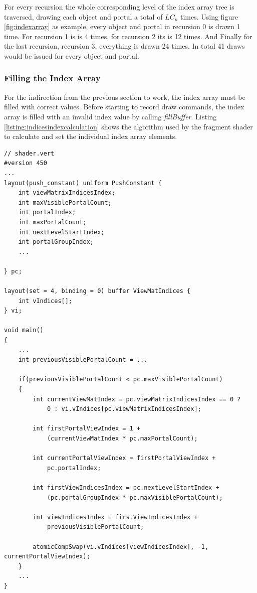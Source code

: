 For every recursion the whole corresponding level of the index array tree is traversed, drawing each object and portal a total of $LC_n$ times. Using figure \ref{fig:indexarray} as example, every object and portal in recursion 0 is drawn 1 time. For recursion 1 is is 4 times, for recursion 2 its is 12 times. And Finally for the last recursion, recursion 3, everything is drawn 24 times. In total 41 draws would be issued for every object and portal.

\subsubsection{Filling the Index Array}
For the indirection from the previous section to work, the index array must be filled with correct values. Before starting to record draw commands, the index array is filled with an invalid index value by calling \textit{fillBuffer}. Listing \ref{listing:indicesindexcalculation} shows the algorithm used by the fragment shader to calculate and set the individual index array elements.

\begin{lstlisting}[caption={Calculating Indices Index}, label=listing:indicesindexcalculation]
// shader.vert
#version 450
...
layout(push_constant) uniform PushConstant {	
	int viewMatrixIndicesIndex;
	int maxVisiblePortalCount;
	int portalIndex;
	int maxPortalCount;
	int nextLevelStartIndex;
	int portalGroupIndex;
	...

} pc;

layout(set = 4, binding = 0) buffer ViewMatIndices {
	int vIndices[];
} vi;

void main()
{
	...
	int previousVisiblePortalCount = ...
	
	if(previousVisiblePortalCount < pc.maxVisiblePortalCount)
	{
		int currentViewMatIndex = pc.viewMatrixIndicesIndex == 0 ? 
			0 : vi.vIndices[pc.viewMatrixIndicesIndex];
		
		int firstPortalViewIndex = 1 +
			(currentViewMatIndex * pc.maxPortalCount);
		
		int currentPortalViewIndex = firstPortalViewIndex +
			pc.portalIndex;
		
		int firstViewIndicesIndex = pc.nextLevelStartIndex +
			(pc.portalGroupIndex * pc.maxVisiblePortalCount);
			
		int viewIndicesIndex = firstViewIndicesIndex +
			previousVisiblePortalCount;
			
		atomicCompSwap(vi.vIndices[viewIndicesIndex], -1, currentPortalViewIndex);
	}
	...	
}

\end{lstlisting}

